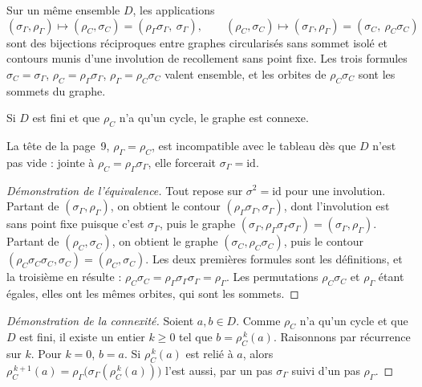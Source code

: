 \begin{enonce}
Sur un même ensemble $D$, les applications
\[
  (\sigma_\Gamma, \rho_\Gamma) \longmapsto (\rho_C, \sigma_C) = (\rho_\Gamma \sigma_\Gamma,\ \sigma_\Gamma),
  \qquad
  (\rho_C, \sigma_C) \longmapsto (\sigma_\Gamma, \rho_\Gamma) = (\sigma_C,\ \rho_C \sigma_C)
\]
sont des bijections réciproques entre graphes circularisés sans sommet isolé et contours munis d'une involution de recollement sans point fixe. Les trois formules $\sigma_C = \sigma_\Gamma$, $\rho_C = \rho_\Gamma \sigma_\Gamma$, $\rho_\Gamma = \rho_C \sigma_C$ valent ensemble, et les orbites de $\rho_C \sigma_C$ sont les sommets du graphe.
\end{enonce}

\begin{enonce}
Si $D$ est fini et que $\rho_C$ n'a qu'un cycle, le graphe est connexe.
\end{enonce}

\begin{remarque}
La tête de la page~9, $\rho_\Gamma = \rho_C$, est incompatible avec le tableau dès que $D$ n'est pas vide : jointe à $\rho_C = \rho_\Gamma \sigma_\Gamma$, elle forcerait $\sigma_\Gamma = \mathrm{id}$.
\end{remarque}

\begin{proof}[Démonstration de l'équivalence]
Tout repose sur $\sigma^2 = \mathrm{id}$ pour une involution. Partant de $(\sigma_\Gamma, \rho_\Gamma)$, on obtient le contour $(\rho_\Gamma \sigma_\Gamma, \sigma_\Gamma)$, dont l'involution est sans point fixe puisque c'est $\sigma_\Gamma$, puis le graphe $(\sigma_\Gamma, \rho_\Gamma \sigma_\Gamma \sigma_\Gamma) = (\sigma_\Gamma, \rho_\Gamma)$. Partant de $(\rho_C, \sigma_C)$, on obtient le graphe $(\sigma_C, \rho_C \sigma_C)$, puis le contour $(\rho_C \sigma_C \sigma_C, \sigma_C) = (\rho_C, \sigma_C)$. Les deux premières formules sont les définitions, et la troisième en résulte : $\rho_C \sigma_C = \rho_\Gamma \sigma_\Gamma \sigma_\Gamma = \rho_\Gamma$. Les permutations $\rho_C \sigma_C$ et $\rho_\Gamma$ étant égales, elles ont les mêmes orbites, qui sont les sommets.
\end{proof}

\begin{proof}[Démonstration de la connexité]
Soient $a, b \in D$. Comme $\rho_C$ n'a qu'un cycle et que $D$ est fini, il existe un entier $k \geq 0$ tel que $b = \rho_C^{\,k}(a)$. Raisonnons par récurrence sur $k$. Pour $k = 0$, $b = a$. Si $\rho_C^{\,k}(a)$ est relié à $a$, alors $\rho_C^{\,k+1}(a) = \rho_\Gamma\bigl(\sigma_\Gamma(\rho_C^{\,k}(a))\bigr)$ l'est aussi, par un pas $\sigma_\Gamma$ suivi d'un pas $\rho_\Gamma$.
\end{proof}

